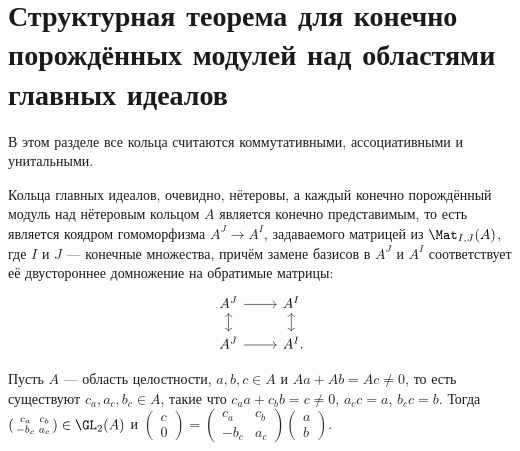 \documentclass[
	extrafontsizes,
	11pt,
	hyphens,
]{memoir}
\begin{document}
\section[Структурная теорема для конечно порождённых модулей над областями главных идеалов][Структурная теорема для кон.\ пор.\ модулей над ОГИ]{Структурная теорема для конечно порождённых модулей над областями главных идеалов}

\begin{convention}
В этом разделе все кольца считаются коммутативными, ассоциативными и унитальными.
\end{convention}

\begin{observation}
\label{obs:modpid}
Кольца главных идеалов, очевидно, нётеровы,
а каждый конечно порождённый модуль над нётеровым кольцом \(A\) является конечно представимым, то есть является коядром гомоморфизма
\(A^J \to A^I\), задаваемого матрицей из \(\Mat_{I,J}(A)\), где \(I\) и \(J\) --- конечные множества, причём замене базисов в
\(A^J\) и \(A^I\) соответствует её двустороннее домножение на обратимые матрицы:
\begin{equation*}
\begin{tikzcd}[row sep = scriptsize]
    A^J \arrow{r} \arrow[leftrightarrow]{d} & A^I \arrow[leftrightarrow]{d} \\
    A^J \arrow{r} & A^I\mathrlap{.}
\end{tikzcd}
\label{eq:Am_to_An}
\end{equation*}
\end{observation}


\begin{lemma}
Пусть \(A\) --- область целостности, \(a,b,c \in A\) и \(Aa + Ab = Ac \neq 0\), то есть существуют \(c_a,a_c,b_c \in A\), такие что \(c_a a + c_b b = c \neq 0\), \(a_c c = a\), \(b_c c = b\).
\label{lem:PIDmatrix2}
Тогда
\(
(
\begin{smallmatrix}
    c_a & c_b \\
    -b_c & a_c
\end{smallmatrix}
)
\in
\GL_2(A)
\)
и
\(
(
\begin{smallmatrix}
    c \\
    0 
\end{smallmatrix}
)
=
(
\begin{smallmatrix}
    c_a & c_b \\
    -b_c & a_c
\end{smallmatrix}
)
(
\begin{smallmatrix}
    a \\
    b 
\end{smallmatrix}
)
\).
\end{lemma}
\end{document}
